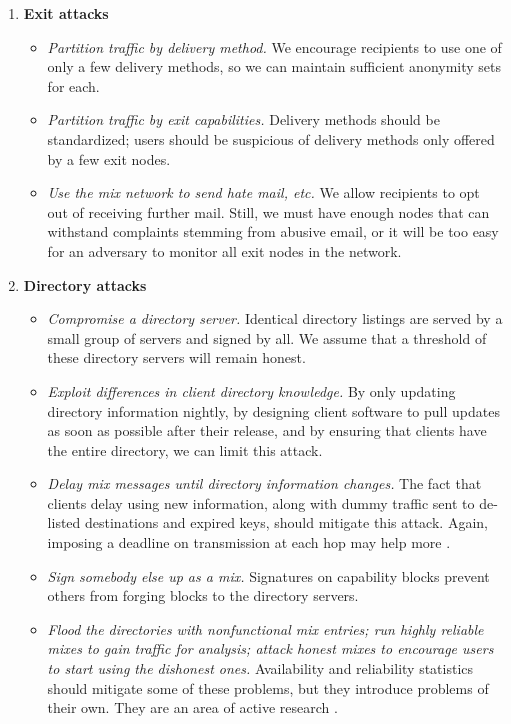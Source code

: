 \documentclass[final]{ieee}
\begin{document}
\begin{enumerate}
\item \textbf{Exit attacks}

\begin{itemize}
\item \emph{Partition traffic by delivery method.} We encourage recipients
to use one of only a few delivery methods, so we can maintain sufficient
anonymity sets for each.
\item \emph{Partition traffic by exit capabilities.}
Delivery methods should be standardized; users should be suspicious of
delivery methods only offered by a few exit nodes.
\item \emph{Use the mix network to send hate mail, etc.} We allow
recipients to opt out of receiving further mail.  Still, we must have
enough nodes that can withstand complaints stemming from abusive
email, or it will be too easy for an adversary to monitor all exit nodes in
the network.
\end{itemize}

\item \textbf{Directory attacks}

\begin{itemize}
\item \emph{Compromise a directory server.} Identical directory listings
are served by a small group of servers and signed by all. We assume
that a threshold of these directory servers will remain honest.
\item \emph{Exploit differences in client directory knowledge.} By only
updating directory information nightly, by designing client software to
pull updates as soon as possible after their release, and by ensuring
that clients have the entire directory, we can limit this attack.
\item \emph{Delay mix messages until directory information changes.}
The fact that clients delay using new information, along with dummy
traffic sent to de-listed destinations and expired keys, should mitigate
this attack. Again, imposing a deadline on transmission at each hop
may help more \cite{mix-acc}.
\item \emph{Sign somebody else up as a mix.}  Signatures on capability
blocks prevent others from forging blocks to the directory servers.
\item \emph{Flood the directories with nonfunctional mix entries; run
highly reliable mixes to gain traffic for analysis; attack honest mixes
to encourage users to start using the dishonest ones.}
Availability and reliability statistics should mitigate some of these
problems, but they introduce problems of their own. They are an area of
active research \cite{mix-acc}\cite{casc-rep}.
\end{itemize}
\end{enumerate}
\end{document}
